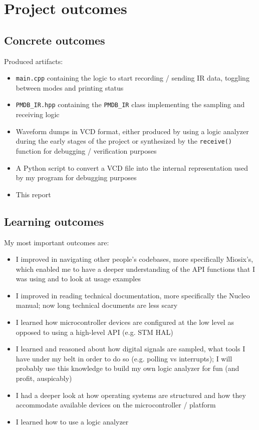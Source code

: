 \documentclass[10pt,a4]{article}
\begin{document}
\section{Project outcomes}

\subsection{Concrete outcomes}

Produced artifacts:
\begin{itemize}
\item \texttt{main.cpp} containing the logic to start recording / sending IR data, toggling between modes and printing status
\item \texttt{PMDB\_IR.hpp} containing the \texttt{PMDB\_IR} class implementing the sampling and receiving logic
\item Waveform dumps in VCD format, either produced by using a logic analyzer during the early stages of the project or synthesized by the \texttt{receive()} function for debugging / verification purposes
\item A Python script to convert a VCD file into the internal representation used by my program for debugging purposes
\item This report
\end{itemize}

\subsection{Learning outcomes}

My most important outcomes are:
\begin{itemize}
\item I improved in navigating other people's codebases, more specifically Miosix's, which enabled me to have a deeper understanding of the API functions that I was using and to look at usage examples
\item I improved in reading technical documentation, more specifically the Nucleo manual; now long technical documents are less scary
\item I learned how microcontroller devices are configured at the low level as opposed to using a high-level API (e.g. STM HAL)
\item I learned and reasoned about how digital signals are sampled, what tools I have under my belt in order to do so (e.g. polling vs interrupts); I will probably use this knowledge to build my own logic analyzer for fun (and profit, auspicably)
\item I had a deeper look at how operating systems are structured and how they accommodate available devices on the microcontroller / platform
\item I learned how to use a logic analyzer
\end{itemize}
\end{document}
